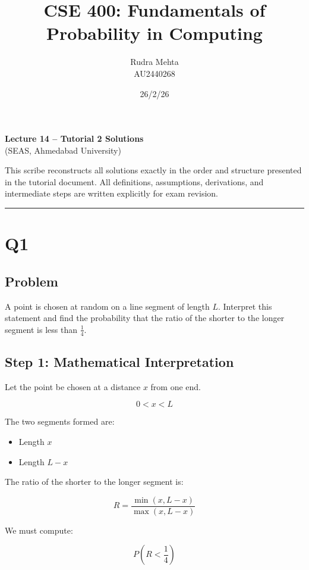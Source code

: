 \documentclass[12pt]{article}
\title{CSE 400: Fundamentals of Probability in Computing}
\author{Rudra Mehta \\ AU2440268}
\date{26/2/26}
\begin{document}
\maketitle

\begin{center}
\textbf{Lecture 14 – Tutorial 2 Solutions} \\
(SEAS, Ahmedabad University)
\end{center}

\vspace{0.5cm}

This scribe reconstructs all solutions exactly in the order and structure presented in the tutorial document. All definitions, assumptions, derivations, and intermediate steps are written explicitly for exam revision.

\hrule
\vspace{0.5cm}

\section*{Q1}

\subsection*{Problem}

A point is chosen at random on a line segment of length $L$. Interpret this statement and find the probability that the ratio of the shorter to the longer segment is less than $\frac{1}{4}$.

\subsection*{Step 1: Mathematical Interpretation}

Let the point be chosen at a distance $x$ from one end.

\[
0 < x < L
\]

The two segments formed are:

\begin{itemize}
\item Length $x$
\item Length $L - x$
\end{itemize}

The ratio of the shorter to the longer segment is:

\[
R = \frac{\min(x, L-x)}{\max(x, L-x)}
\]

We must compute:

\[
P\left(R < \frac{1}{4}\right)
\]
\end{document}
